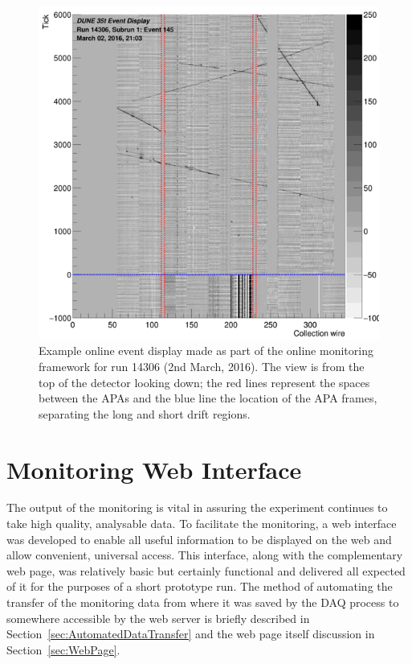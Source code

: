\begin{figure}
  \centering
  \includegraphics[width=14cm]{evd.png}
  \caption[Example online event display made by the Online Monitoring framework]{Example online event display made as part of the online monitoring framework for run 14306 (2nd March, 2016).  The view is from the top of the detector looking down; the red lines represent the spaces between the APAs and the blue line the location of the APA frames, separating the long and short drift regions.}
  \label{fig:EVD}
\end{figure}

\section{Monitoring Web Interface}\label{sec:WebInterface}

The output of the monitoring is vital in assuring the experiment continues to take high quality, analysable data.  To facilitate the monitoring, a web interface was developed to enable all useful information to be displayed on the web and allow convenient, universal access.  This interface, along with the complementary web page, was relatively basic but certainly functional and delivered all expected of it for the purposes of a short prototype run.  The method of automating the transfer of the monitoring data from where it was saved by the DAQ process to somewhere accessible by the web server is briefly described in Section~\ref{sec:AutomatedDataTransfer} and the web page itself discussion in Section~\ref{sec:WebPage}.

